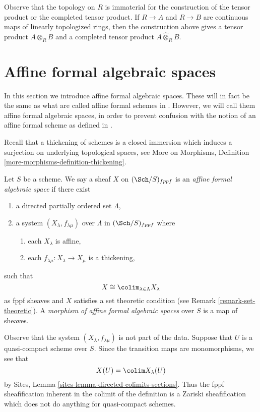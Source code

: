 \noindent
Observe that the topology on $R$ is immaterial for the construction
of the tensor product or the completed tensor product.
If $R \to A$ and $R \to B$ are continuous maps of
linearly topologized rings, then the construction above
gives a tensor product $A \otimes_R B$ and a completed
tensor product $A \widehat\otimes_R B$.




\section{Affine formal algebraic spaces}
\label{section-affine-formal-algebraic-spaces}

\noindent
In this section we introduce affine formal algebraic spaces.
These will in fact be the same as what are called affine
formal schemes in \cite{BVGD}. However, we will call
them affine formal algebraic spaces, in order to prevent confusion with
the notion of an affine formal scheme as defined in \cite{EGA}.

\medskip\noindent
Recall that a thickening of schemes is a closed
immersion which induces a surjection on underlying topological
spaces, see More on Morphisms, Definition
\ref{more-morphisms-definition-thickening}.

\begin{definition}
\label{definition-affine-formal-algebraic-space}
Let $S$ be a scheme. We say a sheaf $X$ on $(\Sch/S)_{fppf}$ is an
{\it affine formal algebraic space} if there exist
\begin{enumerate}
\item a directed partially ordered set $\Lambda$,
\item a system $(X_\lambda, f_{\lambda \mu})$ over $\Lambda$
in $(\Sch/S)_{fppf}$ where
\begin{enumerate}
\item each $X_\lambda$ is affine,
\item each $f_{\lambda \mu} : X_\lambda \to X_\mu$ is a thickening,
\end{enumerate}
\end{enumerate}
such that
$$
X \cong \colim_{\lambda \in \Lambda} X_\lambda
$$
as fppf sheaves and $X$ satisfies a set theoretic condition
(see Remark \ref{remark-set-theoretic}). A
{\it morphism of affine formal algebraic spaces}
over $S$ is a map of sheaves.
\end{definition}

\noindent
Observe that the system $(X_\lambda, f_{\lambda \mu})$ is not
part of the data. Suppose that $U$ is a quasi-compact scheme over $S$.
Since the transition maps are monomorphisms, we see that
$$
X(U) = \colim X_\lambda(U)
$$
by Sites, Lemma \ref{sites-lemma-directed-colimits-sections}.
Thus the fppf sheafification inherent in the colimit of the
definition is a Zariski sheafification which does not do
anything for quasi-compact schemes.

